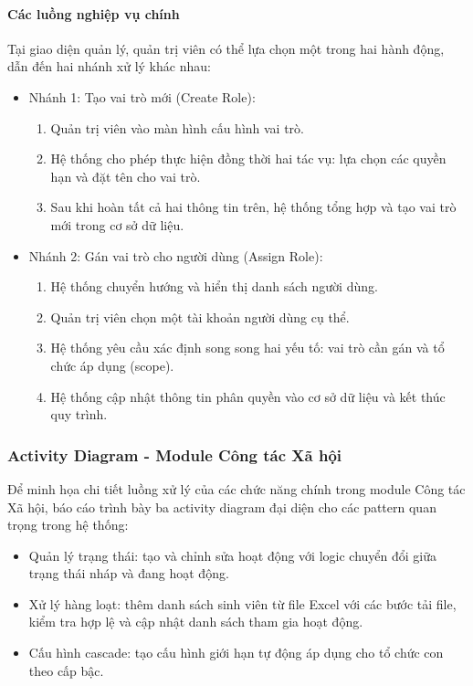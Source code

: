 \paragraph{Các luồng nghiệp vụ chính}
Tại giao diện quản lý, quản trị viên có thể lựa chọn một trong hai hành động, dẫn đến hai nhánh xử lý khác nhau:
\begin{itemize}
	\item Nhánh 1: Tạo vai trò mới (Create Role):
	\begin{enumerate}
		\item Quản trị viên vào màn hình cấu hình vai trò.
		\item Hệ thống cho phép thực hiện đồng thời hai tác vụ: lựa chọn các quyền hạn và đặt tên cho vai trò.
		\item Sau khi hoàn tất cả hai thông tin trên, hệ thống tổng hợp và tạo vai trò mới trong cơ sở dữ liệu.
	\end{enumerate}
	\item Nhánh 2: Gán vai trò cho người dùng (Assign Role):
	\begin{enumerate}
		\item Hệ thống chuyển hướng và hiển thị danh sách người dùng.
		\item Quản trị viên chọn một tài khoản người dùng cụ thể.
		\item Hệ thống yêu cầu xác định song song hai yếu tố: vai trò cần gán và tổ chức áp dụng (scope).
		\item Hệ thống cập nhật thông tin phân quyền vào cơ sở dữ liệu và kết thúc quy trình.
	\end{enumerate}
\end{itemize}

\subsubsection{Activity Diagram - Module Công tác Xã hội}
Để minh họa chi tiết luồng xử lý của các chức năng chính trong module Công tác Xã hội, báo cáo trình bày ba activity diagram đại diện cho các pattern quan trọng trong hệ thống:
\begin{itemize}
	\item Quản lý trạng thái: tạo và chỉnh sửa hoạt động với logic chuyển đổi giữa trạng thái nháp và đang hoạt động.
	\item Xử lý hàng loạt: thêm danh sách sinh viên từ file Excel với các bước tải file, kiểm tra hợp lệ và cập nhật danh sách tham gia hoạt động.
	\item Cấu hình cascade: tạo cấu hình giới hạn tự động áp dụng cho tổ chức con theo cấp bậc.
\end{itemize}

